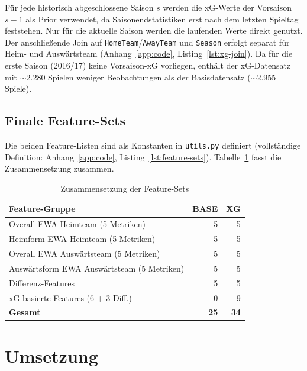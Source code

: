 Für jede historisch abgeschlossene Saison $s$ werden die xG-Werte der
Vorsaison $s-1$ als Prior verwendet, da Saisonendstatistiken erst nach
dem letzten Spieltag feststehen. Nur für die aktuelle Saison werden
die laufenden Werte direkt genutzt. Der anschließende Join auf
\texttt{HomeTeam}/\texttt{AwayTeam} und \texttt{Season} erfolgt separat
für Heim- und Auswärtsteam (Anhang~\ref{app:code}, Listing~\ref{lst:xg-join}).
Da für die erste Saison (2016/17) keine Vorsaison-xG vorliegen, enthält
der xG-Datensatz mit $\sim$2.280 Spielen weniger Beobachtungen als der
Basisdatensatz ($\sim$2.955 Spiele).

\subsection{Finale Feature-Sets}

Die beiden Feature-Listen sind als Konstanten in \texttt{utils.py}
definiert (vollständige Definition: Anhang~\ref{app:code},
Listing~\ref{lst:feature-sets}).
Tabelle~\ref{tab:feature-sets-impl} fasst die Zusammensetzung zusammen.

\begin{table}[h]
    \centering
    \caption{Zusammensetzung der Feature-Sets}
    \label{tab:feature-sets-impl}
    \begin{tabular}{l r r}
        \toprule
        \textbf{Feature-Gruppe} & \textbf{BASE} & \textbf{XG} \\
        \midrule
        Overall EWA Heimteam (5 Metriken)          & 5  & 5  \\
        Heimform EWA Heimteam (5 Metriken)         & 5  & 5  \\
        Overall EWA Auswärtsteam (5 Metriken)      & 5  & 5  \\
        Auswärtsform EWA Auswärtsteam (5 Metriken) & 5  & 5  \\
        Differenz-Features                         & 5  & 5  \\
        xG-basierte Features (6 + 3 Diff.)         & 0  & 9  \\
        \midrule
        \textbf{Gesamt}                            & \textbf{25} & \textbf{34} \\
        \bottomrule
    \end{tabular}
\end{table}

\section{Umsetzung}
\label{sec:umsetzung}

